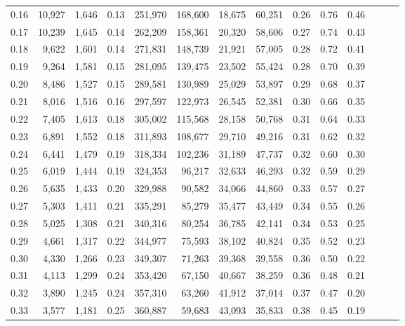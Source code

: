 \begin{tabular}{rrrrrrrrrrrrrr}
0.16 &  10,927 &  1,646 &  0.13 &  251,970 &  168,600 &  18,675 &  60,251 &  0.26 &  0.76 &      0.46 \\
0.17 &  10,239 &  1,645 &  0.14 &  262,209 &  158,361 &  20,320 &  58,606 &  0.27 &  0.74 &      0.43 \\
0.18 &   9,622 &  1,601 &  0.14 &  271,831 &  148,739 &  21,921 &  57,005 &  0.28 &  0.72 &      0.41 \\
0.19 &   9,264 &  1,581 &  0.15 &  281,095 &  139,475 &  23,502 &  55,424 &  0.28 &  0.70 &      0.39 \\
0.20 &   8,486 &  1,527 &  0.15 &  289,581 &  130,989 &  25,029 &  53,897 &  0.29 &  0.68 &      0.37 \\
0.21 &   8,016 &  1,516 &  0.16 &  297,597 &  122,973 &  26,545 &  52,381 &  0.30 &  0.66 &      0.35 \\
0.22 &   7,405 &  1,613 &  0.18 &  305,002 &  115,568 &  28,158 &  50,768 &  0.31 &  0.64 &      0.33 \\
0.23 &   6,891 &  1,552 &  0.18 &  311,893 &  108,677 &  29,710 &  49,216 &  0.31 &  0.62 &      0.32 \\
0.24 &   6,441 &  1,479 &  0.19 &  318,334 &  102,236 &  31,189 &  47,737 &  0.32 &  0.60 &      0.30 \\
0.25 &   6,019 &  1,444 &  0.19 &  324,353 &   96,217 &  32,633 &  46,293 &  0.32 &  0.59 &      0.29 \\
0.26 &   5,635 &  1,433 &  0.20 &  329,988 &   90,582 &  34,066 &  44,860 &  0.33 &  0.57 &      0.27 \\
0.27 &   5,303 &  1,411 &  0.21 &  335,291 &   85,279 &  35,477 &  43,449 &  0.34 &  0.55 &      0.26 \\
0.28 &   5,025 &  1,308 &  0.21 &  340,316 &   80,254 &  36,785 &  42,141 &  0.34 &  0.53 &      0.25 \\
0.29 &   4,661 &  1,317 &  0.22 &  344,977 &   75,593 &  38,102 &  40,824 &  0.35 &  0.52 &      0.23 \\
0.30 &   4,330 &  1,266 &  0.23 &  349,307 &   71,263 &  39,368 &  39,558 &  0.36 &  0.50 &      0.22 \\
0.31 &   4,113 &  1,299 &  0.24 &  353,420 &   67,150 &  40,667 &  38,259 &  0.36 &  0.48 &      0.21 \\
0.32 &   3,890 &  1,245 &  0.24 &  357,310 &   63,260 &  41,912 &  37,014 &  0.37 &  0.47 &      0.20 \\
0.33 &   3,577 &  1,181 &  0.25 &  360,887 &   59,683 &  43,093 &  35,833 &  0.38 &  0.45 &      0.19 \\

\end{tabular}
